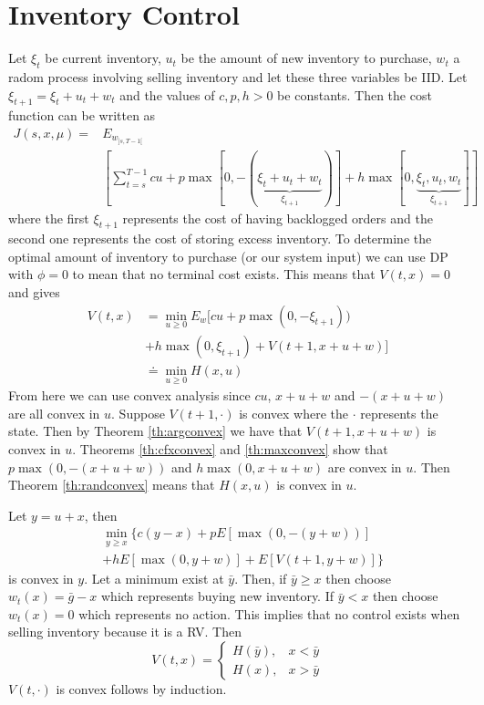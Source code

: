\section{Inventory Control}
Let $\xi_t$ be current inventory, $u_t$ be the amount of new inventory to purchase, $w_t$ a radom process involving selling inventory and let these three variables be IID. Let $\xi_{t+1} = \xi_t+u_t+w_t$ and the values of $c,p,h>0$ be constants. Then the cost function can be written as
\begin{align*}
J(s,x,\mu) =& E_{w_{]s,T-1[}} \\
&\left[\sum_{t=s}^{T-1}cu+p\max[0,-(\underbrace{\xi_t+u_t+w_t}_{\xi_{t+1}})] + h\max[0,\underbrace{\xi_t,u_t,w_t}_{\xi_{t+1}}] \right]
\end{align*}
where the first $\xi_{t+1}$ represents the cost of having backlogged orders and the second one represents the cost of storing excess inventory. To determine the optimal amount of inventory to purchase (or our system input) we can use DP with $\phi=0$ to mean that no terminal cost exists. This means that $V(t,x)=0$ and gives
\begin{align*}
V(t,x) &= \min_{u\geq 0}E_w[cu+p\max(0,-\xi_{t+1})) \\
&+ h\max(0,\xi_{t+1}) + V(t+1,x+u+w)] \\
&\doteq \min_{u\geq 0}H(x,u)
\end{align*}
From here we can use convex analysis since $cu$, $x+u+w$ and $-(x+u+w)$ are all convex in $u$. Suppose $V(t+1,\cdot)$ is convex where the $\cdot$ represents the state. Then by Theorem \ref{th:argconvex} we have that $V(t+1,x+u+w)$ is convex in $u$. Theorems \ref{th:cfxconvex} and \ref{th:maxconvex} show that $p\max(0,-(x+u+w))$ and $h\max(0,x+u+w)$ are convex in $u$. Then Theorem \ref{th:randconvex} means that $H(x,u)$ is convex in $u$.

Let $y=u+x$, then
\begin{align*}
&\min_{y\geq x}\{ c(y-x)+pE[\max(0,-(y+w))] \\
&+ hE[\max(0,y+w)] + E[V(t+1,y+w)]\}
\end{align*}
is convex in $y$. Let a minimum exist at $\bar{y}$. Then, if $\bar{y}\geq x$ then choose $w_t(x) = \bar{g}-x$ which represents buying new inventory. If $\bar{y}<x$ then choose $w_t(x)=0$ which represents no action. This implies that no control exists when selling inventory because it is a RV. Then
$$V(t,x) = \begin{cases} H(\bar{y}), & x<\bar{y} \\ H(x), & x>\bar{y} \end{cases}$$
$V(t,\cdot)$ is convex follows by induction.

